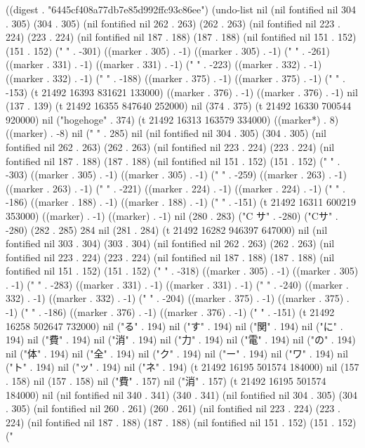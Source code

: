 
((digest . "6445cf408a77db7e85d992ffc93c86ee") (undo-list nil (nil fontified nil 304 . 305) (304 . 305) (nil fontified nil 262 . 263) (262 . 263) (nil fontified nil 223 . 224) (223 . 224) (nil fontified nil 187 . 188) (187 . 188) (nil fontified nil 151 . 152) (151 . 152) ("
" . -301) ((marker . 305) . -1) ((marker . 305) . -1) ("
" . -261) ((marker . 331) . -1) ((marker . 331) . -1) ("
" . -223) ((marker . 332) . -1) ((marker . 332) . -1) ("
" . -188) ((marker . 375) . -1) ((marker . 375) . -1) ("
" . -153) (t 21492 16393 831621 133000) ((marker . 376) . -1) ((marker . 376) . -1) nil (137 . 139) (t 21492 16355 847640 252000) nil (374 . 375) (t 21492 16330 700544 920000) nil ("hogehoge" . 374) (t 21492 16313 163579 334000) ((marker*) . 8) ((marker) . -8) nil (" " . 285) nil (nil fontified nil 304 . 305) (304 . 305) (nil fontified nil 262 . 263) (262 . 263) (nil fontified nil 223 . 224) (223 . 224) (nil fontified nil 187 . 188) (187 . 188) (nil fontified nil 151 . 152) (151 . 152) ("
" . -303) ((marker . 305) . -1) ((marker . 305) . -1) ("
" . -259) ((marker . 263) . -1) ((marker . 263) . -1) ("
" . -221) ((marker . 224) . -1) ((marker . 224) . -1) ("
" . -186) ((marker . 188) . -1) ((marker . 188) . -1) ("
" . -151) (t 21492 16311 600219 353000) ((marker) . -1) ((marker) . -1) nil (280 . 283) ("C サ" . -280) ("Cサ" . -280) (282 . 285) 284 nil (281 . 284) (t 21492 16282 946397 647000) nil (nil fontified nil 303 . 304) (303 . 304) (nil fontified nil 262 . 263) (262 . 263) (nil fontified nil 223 . 224) (223 . 224) (nil fontified nil 187 . 188) (187 . 188) (nil fontified nil 151 . 152) (151 . 152) ("
" . -318) ((marker . 305) . -1) ((marker . 305) . -1) ("
" . -283) ((marker . 331) . -1) ((marker . 331) . -1) ("
" . -240) ((marker . 332) . -1) ((marker . 332) . -1) ("
" . -204) ((marker . 375) . -1) ((marker . 375) . -1) ("
" . -186) ((marker . 376) . -1) ((marker . 376) . -1) ("
" . -151) (t 21492 16258 502647 732000) nil ("る" . 194) nil ("す" . 194) nil ("関" . 194) nil ("に" . 194) nil ("費" . 194) nil ("消" . 194) nil ("力" . 194) nil ("電" . 194) nil ("の" . 194) nil ("体" . 194) nil ("全" . 194) nil ("ク" . 194) nil ("ー" . 194) nil ("ワ" . 194) nil ("ト" . 194) nil ("ッ" . 194) nil ("ネ" . 194) (t 21492 16195 501574 184000) nil (157 . 158) nil (157 . 158) nil ("費" . 157) nil ("消" . 157) (t 21492 16195 501574 184000) nil (nil fontified nil 340 . 341) (340 . 341) (nil fontified nil 304 . 305) (304 . 305) (nil fontified nil 260 . 261) (260 . 261) (nil fontified nil 223 . 224) (223 . 224) (nil fontified nil 187 . 188) (187 . 188) (nil fontified nil 151 . 152) (151 . 152) ("
